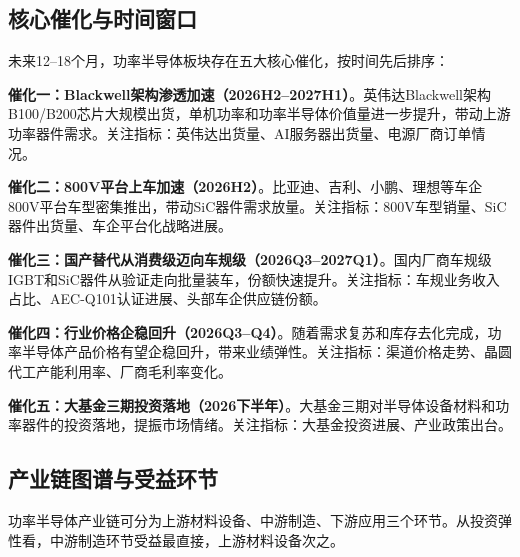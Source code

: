 \subsection{核心催化与时间窗口}

未来12--18个月，功率半导体板块存在五大核心催化，按时间先后排序：

\vspace{0.3em}

\textbf{催化一：Blackwell架构渗透加速（2026H2--2027H1）}。英伟达Blackwell架构B100/B200芯片大规模出货，单机功率和功率半导体价值量进一步提升，带动上游功率器件需求。关注指标：英伟达出货量、AI服务器出货量、电源厂商订单情况。

\vspace{0.3em}

\textbf{催化二：800V平台上车加速（2026H2）}。比亚迪、吉利、小鹏、理想等车企800V平台车型密集推出，带动SiC器件需求放量。关注指标：800V车型销量、SiC器件出货量、车企平台化战略进展。

\vspace{0.3em}

\textbf{催化三：国产替代从消费级迈向车规级（2026Q3--2027Q1）}。国内厂商车规级IGBT和SiC器件从验证走向批量装车，份额快速提升。关注指标：车规业务收入占比、AEC-Q101认证进展、头部车企供应链份额。

\vspace{0.3em}

\textbf{催化四：行业价格企稳回升（2026Q3--Q4）}。随着需求复苏和库存去化完成，功率半导体产品价格有望企稳回升，带来业绩弹性。关注指标：渠道价格走势、晶圆代工产能利用率、厂商毛利率变化。

\vspace{0.3em}

\textbf{催化五：大基金三期投资落地（2026下半年）}。大基金三期对半导体设备材料和功率器件的投资落地，提振市场情绪。关注指标：大基金投资进展、产业政策出台。

\subsection{产业链图谱与受益环节}

功率半导体产业链可分为上游材料设备、中游制造、下游应用三个环节。从投资弹性看，中游制造环节受益最直接，上游材料设备次之。

